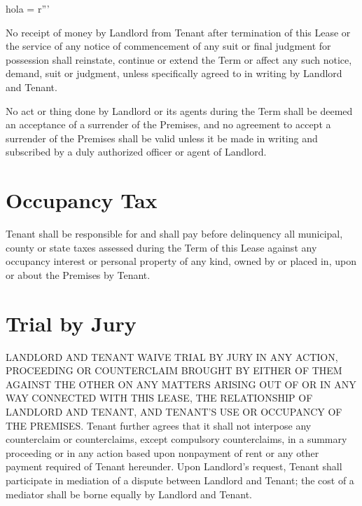 hola = r'''\documentclass{article}
\begin{document}
    No receipt of money by Landlord from Tenant after termination of this Lease or the service of any notice of commencement of any suit or final judgment for possession shall reinstate, continue or extend the Term or affect any such notice, demand, suit or judgment, unless specifically agreed to in writing by Landlord and Tenant.

    No act or thing done by Landlord or its agents during the Term shall be deemed an acceptance of a surrender of the Premises, and no agreement to accept a surrender of the Premises shall be valid unless it be made in writing and subscribed by a duly authorized officer or agent of Landlord.



\section{Occupancy Tax}
    Tenant shall be responsible for and shall pay before delinquency all municipal, county or state taxes assessed during the Term of this Lease against any occupancy interest or personal property of any kind, owned by or placed in, upon or about the Premises by Tenant.

\section{Trial by Jury}
    LANDLORD AND TENANT WAIVE TRIAL BY JURY IN ANY ACTION, PROCEEDING OR COUNTERCLAIM BROUGHT BY EITHER OF THEM AGAINST THE OTHER ON ANY MATTERS ARISING OUT OF OR IN ANY WAY CONNECTED WITH THIS LEASE, THE RELATIONSHIP OF LANDLORD AND TENANT, AND TENANT'S USE OR OCCUPANCY OF THE PREMISES. Tenant further agrees that it shall not interpose any counterclaim or counterclaims, except compulsory counterclaims, in a summary proceeding or in any action based upon nonpayment of rent or any other payment required of Tenant hereunder. Upon Landlord's request, Tenant shall participate in mediation of a dispute between Landlord and Tenant; the cost of a mediator shall be borne equally by Landlord and Tenant.
\end{document}
